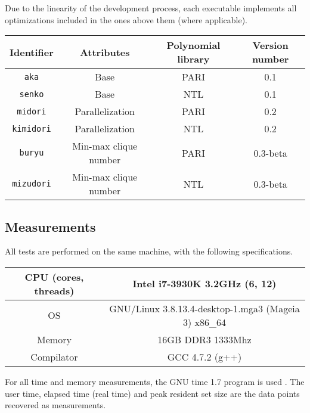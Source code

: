 \documentclass[a4paper]{article}
\newcommand{\code}{\texttt}
\begin{document}
Due to the linearity of the development process, each executable implements all optimizations included in the ones above them (where applicable).

\begin{tabular}{c|c|c|c}
 Identifier & Attributes & Polynomial library & Version number \\ \hline
 \code{aka} & Base & PARI & 0.1 \\
 \code{senko} & Base & NTL & 0.1 \\
 \code{midori} & Parallelization & PARI & 0.2 \\
 \code{kimidori} & Parallelization & NTL & 0.2 \\
 \code{buryu} & Min-max clique number & PARI & 0.3-beta \\
 \code{mizudori} & Min-max clique number & NTL & 0.3-beta \\
\end{tabular}


\subsection{Measurements}
All tests are performed on the same machine, with the following specifications.

\begin{center}
\begin{tabular}{|c|c|} \hline
CPU (cores, threads) & Intel i7-3930K 3.2GHz (6, 12) \\ \hline
OS & GNU/Linux 3.8.13.4-desktop-1.mga3 (Mageia 3) x86\_64 \\ \hline
Memory & 16GB DDR3 1333Mhz \\ \hline
Compilator & GCC 4.7.2 (g++) \\ \hline
\end{tabular}
\end{center}

For all time and memory measurements, the GNU time 1.7 program is used \cite{time}. The user time, elapsed time (real time) and peak resident set size are the data points recovered as measurements.
\end{document}

